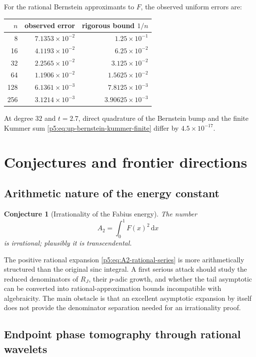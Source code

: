 \documentclass[11pt,oneside]{article}
\newtheorem{conjecture}[theorem]{Conjecture}
\theoremstyle{definition}
\newcommand{\dd}{\,\mathrm d}
\begin{document}
For the rational Bernstein approximants to $F$, the observed uniform errors
are:
\begin{center}
\begin{tabular}{@{}rrr@{}}
\toprule
$n$ & observed error & rigorous bound $1/n$\\
\midrule
8   & $7.1353\times10^{-2}$ & $1.25\times10^{-1}$\\
16  & $4.1193\times10^{-2}$ & $6.25\times10^{-2}$\\
32  & $2.2565\times10^{-2}$ & $3.125\times10^{-2}$\\
64  & $1.1906\times10^{-2}$ & $1.5625\times10^{-2}$\\
128 & $6.1361\times10^{-3}$ & $7.8125\times10^{-3}$\\
256 & $3.1214\times10^{-3}$ & $3.90625\times10^{-3}$\\
\bottomrule
\end{tabular}
\end{center}
At degree $32$ and $t=2.7$, direct quadrature of the Bernstein bump and the
finite Kummer sum \eqref{p5:eq:up-bernstein-kummer-finite} differ by
$4.5\times10^{-17}$.

\section{Conjectures and frontier directions}
\label{p5:sec:frontier}

\subsection{Arithmetic nature of the energy constant}

\begin{conjecture}[Irrationality of the Fabius energy]
\label{p5:conj:A2-irrational}
The number
\[
 A_2=\int_0^1F(x)^2\dd x
\]
is irrational; plausibly it is transcendental.
\end{conjecture}

The positive rational expansion \eqref{p5:eq:A2-rational-series} is more
arithmetically structured than the original sinc integral.  A first serious
attack should study the reduced denominators of $R_J$, their $p$-adic growth,
and whether the tail asymptotic can be converted into rational-approximation
bounds incompatible with algebraicity.  The main obstacle is that an
excellent asymptotic expansion by itself does not provide the denominator
separation needed for an irrationality proof.

\subsection{Endpoint phase tomography through rational wavelets}
\end{document}
